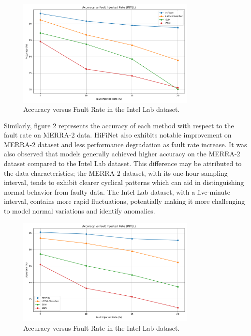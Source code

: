 \begin{figure}
  \centering
    \includegraphics[width=0.8\textwidth]{images/INTEL_accuracy.png}
    \caption{Accuracy versus Fault Rate in the Intel Lab dataset.}
    \label{fig:INTEL_accuracy}
\end{figure}

Similarly, figure \ref{fig:MERRA-2_accuracy} represents the accuracy of each method with respect to the fault rate on MERRA-2 data. HiFiNet also exhibits notable improvement on MERRA-2 dataset and less performance degradation as fault rate increase. It was also observed that models generally achieved higher accuracy on the MERRA-2 dataset compared to the Intel Lab dataset. This difference may be attributed to the data characteristics; the MERRA-2 dataset, with its one-hour sampling interval, tends to exhibit clearer cyclical patterns which can aid in distinguishing normal behavior from faulty data. The Intel Lab dataset, with a five-minute interval, contains more rapid fluctuations, potentially making it more challenging to model normal variations and identify anomalies.

\begin{figure}
  \centering
    \includegraphics[width=0.8\textwidth]{images/MERRA-2_accuracy.png}
    \caption{Accuracy versus Fault Rate in the Intel Lab dataset.}
    \label{fig:MERRA-2_accuracy}
\end{figure}

